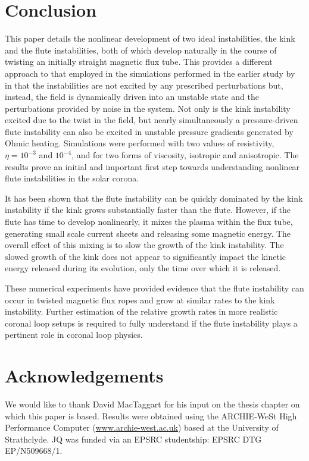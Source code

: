 \documentclass[fleqn,usenatbib]{mnras}
\newcommand{\revcite}[1]{{\color{red} \underline{#1}}}
\begin{document}
\section{Conclusion}
\label{sec-conclusions}

This paper details the nonlinear development of two ideal instabilities, the
kink and the flute instabilities, both of which develop naturally in the course
of twisting an initially straight magnetic flux tube. This provides a different
approach to that employed in the simulations performed in the earlier
study by ~\revcite{\citet{quinnEffectAnisotropicViscosity2020}} in that the instabilities are
not excited by any prescribed perturbations but, instead, the field is
dynamically driven into an unstable state and the perturbations provided by
noise in the system. Not only is the kink instability excited due to the twist
in the field, but nearly simultaneously a pressure-driven flute instability can
also be excited in unstable pressure gradients generated by Ohmic heating.
Simulations were performed with two values of resistivity, $\eta=10^{-3}$ and
$10^{-4}$, and for two forms of viscosity, isotropic and anisotropic. The
results prove an initial and important first step towards understanding
nonlinear flute instabilities in the solar corona.  

It has been shown that the flute instability can be quickly dominated by the
kink instability if the kink grows substantially faster than the flute.
However, if the flute has time to develop nonlinearly, it mixes the plasma
within the flux tube, generating small scale current sheets and releasing some
magnetic energy. The overall effect of this mixing is to slow the growth of the
kink instability. The slowed growth of the kink does not appear to
significantly impact the kinetic energy released during its evolution, only the
time over which it is released. 

These numerical experiments have provided evidence that the flute instability
can occur in twisted magnetic flux ropes and grow at similar rates to the kink
instability. Further estimation of the relative growth rates in more realistic
coronal loop setups is required to fully understand if the flute instability
plays a pertinent role in coronal loop physics.

\section*{Acknowledgements}

We would like to thank David MacTaggart for his input on the thesis chapter on
which this paper is based. Results were obtained using the ARCHIE-WeSt High
Performance Computer (\url{www.archie-west.ac.uk}) based at the University of
Strathclyde. JQ was funded via an EPSRC studentship: EPSRC DTG EP/N509668/1.
\end{document}
